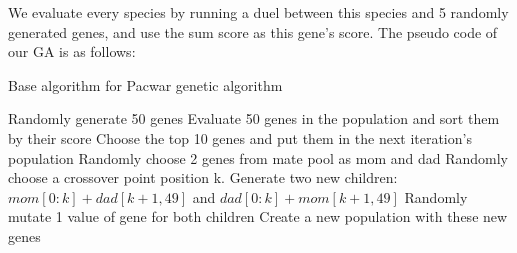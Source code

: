 \documentclass[twoside]{article}
\begin{document}
\begin{multicols}{2}
\noindent We evaluate every species by running a duel between this species and 5 randomly generated genes, and use the sum score as this gene's score. The pseudo code of our GA is as follows:

\end{multicols}

\begin{algorithm}
  \caption{Base algorithm for Pacwar genetic algorithm}

  \begin{algorithmic}
  
	\State Randomly generate 50 genes
	\State Evaluate 50 genes in the population and sort them by their score
	\State Choose the top 10 genes and put them in the next iteration's population
	\State Randomly choose 2 genes from mate pool as mom and dad
	\State Randomly choose a crossover point position k.
	\State Generate two new children: $mom[0:k]+dad[k+1,49]$ and $dad[0:k]+mom[k+1,49]$
	\State Randomly mutate 1 value of gene for both children
	\State Create a new population with these new genes
	\EndFor
  	\EndFor
  \end{algorithmic}
\end{algorithm}
\end{document}
